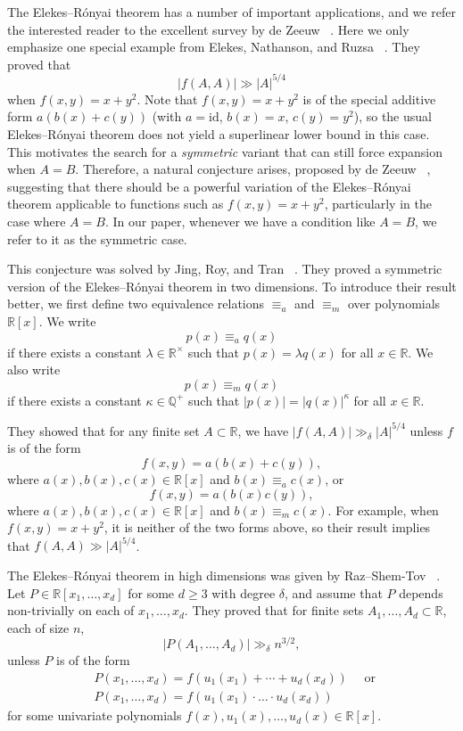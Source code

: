 \documentclass[12pt,reqno]{amsart}
\numberwithin{equation}{section}
\begin{document}
 
  \par The Elekes--R\'{o}nyai theorem has a number of important applications, and we refer the interested reader to the excellent survey by de Zeeuw ~\cite{de2018survey}. Here we only emphasize one special example from Elekes, Nathanson, and Ruzsa ~\cite{elekes2000convexity}. They proved that $$|f(A,A)|\gg |A|^{5/4}$$ when $f(x,y)=x+y^2$.
Note that $f(x,y)=x+y^2$ is of the special additive form $a(b(x)+c(y))$ (with $a=\mathrm{id}$, $b(x)=x$, $c(y)=y^2$),
so the usual Elekes--R\'onyai theorem does not yield a superlinear lower bound in this case.
This motivates the search for a \emph{symmetric} variant that can still force expansion when $A=B$.
 Therefore, a natural conjecture arises, proposed by de Zeeuw ~\cite{de2018survey}, suggesting that there should be a powerful variation of the Elekes--R\'{o}nyai theorem applicable to functions such as $f(x,y)=x+y^2$, particularly in the case where $A=B$. In our paper, whenever we have a condition like $A=B$, we refer to it as the symmetric case.
  
\par This conjecture was solved by Jing, Roy, and Tran ~\cite{jing2022semialgebraic}. They proved a symmetric version of the Elekes--R\'{o}nyai theorem in two dimensions. To introduce their result better, we first define two equivalence relations $\equiv_{a}$ and $\equiv_{m}$ over polynomials $\mathbb{R}[x]$. We write $$p(x) \equiv_{a} q(x)$$ if there exists a constant $\lambda\in\mathbb R^\times $ such that $p(x)=\lambda q(x)$  for all $x\in \mathbb{R}$. We also write $$p(x) \equiv_{m} q(x)$$ if there exists a constant $\kappa\in\mathbb{Q}^{+} $ such that $|p(x)|=|q(x)|^\kappa$ for all $x\in \mathbb{R}$. 





They showed that for any finite set $A \subset \mathbb{R}$, we have $|f(A, A)| \gg_{\delta} |A|^{5/4}$ unless $f$ is of the form $$f(x,y)=a(b(x)+c(y)),$$ where $a(x),b(x),c(x)\in\mathbb{R}[x]$ and $b(x)\equiv_a c(x)$, or $$f(x,y)=a(b(x)c(y)),$$ where $a(x),b(x),c(x)\in\mathbb{R}[x]$ and $b(x)\equiv_{m} c(x)$. For example, when $f(x,y)=x+y^2$, it is neither of the two forms above, so their result implies that $f(A,A)\gg |A|^{5/4}$.


 The Elekes--R\'{o}nyai theorem in high dimensions was given by 
Raz--Shem-Tov ~\cite{raz2020expanding}. Let $P \in \mathbb{R}[x_1, \ldots, x_d]$ for some $d \geq 3$ with degree $\delta$, and assume that $P$ depends non-trivially on each of $x_1, \ldots, x_d$. They proved that for finite sets $A_1, \ldots, A_d \subset \mathbb{R}$, each of size $n$,
$$
|P(A_1, \ldots ,A_d)|\gg_{\delta}n^{3 / 2},
$$
unless $P$ is of the form
$$
\begin{aligned}
& P(x_1, \ldots, x_d)=f(u_1(x_1)+\cdots+u_d(x_d)) \quad\text { or } \\
& P(x_1, \ldots, x_d)=f(u_1(x_1) \cdot \ldots \cdot u_d(x_d))
\end{aligned}
$$
for some univariate polynomials $f(x), u_1(x), \ldots, u_d(x)\in\mathbb{R}[x]$. 
\end{document}
